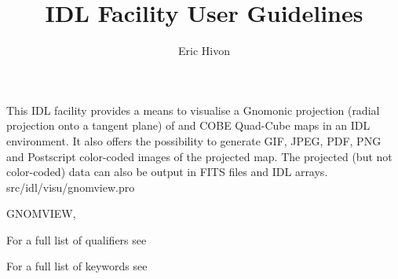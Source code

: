 




\sloppy



\title{\healpix IDL Facility User Guidelines}
 \section[gnomview]{ }
\label{idl:\thedocid}
\author{Eric Hivon}



\begin{facility}
{This IDL facility provides a means to visualise a Gnomonic projection 
(radial projection onto a tangent plane) of
\healpix and COBE Quad-Cube maps in an IDL environment. 
It also offers the possibility to
generate GIF, JPEG, PDF, PNG and Postscript color-coded images of the projected map.
The projected (but not color-coded) data can also be output in FITS files and
IDL arrays.}
{src/idl/visu/gnomview.pro}
\end{facility}

\begin{IDLformat}
{GNOMVIEW, 
\normalsize{
}
}
\end{IDLformat}

\begin{qualifiers}
  \begin{qulist}{} %
\item [{\  }] For a full list of qualifiers see 
  \end{qulist}
\end{qualifiers}

\begin{keywords}
  \begin{kwlist}{} %
\item [{\  }] For a full list of keywords see 
  \end{kwlist}
\end{keywords}


